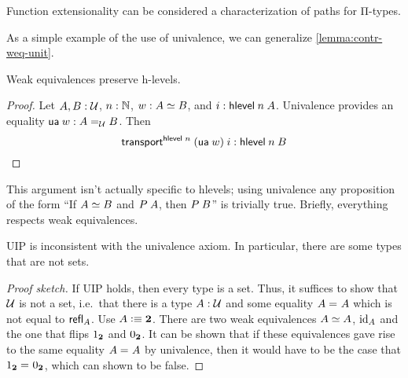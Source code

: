\documentclass[./thesis.tex]{subfiles}
\begin{document}
Function extensionality can be considered a characterization of paths for Π-types.

As a simple example of the use of univalence, we can generalize
\cref{lemma:contr-weq-unit}.

\begin{theorem}
	Weak equivalences preserve h-levels.
\end{theorem}
\begin{proof}
  Let $A,B:\mathcal{U}$, $n:\mathbb{N}$, $w:A \simeq B$, and $i:\mathsf{hlevel}\hspace{0.25em} n \hspace{0.25em} A$.
	Univalence provides an equality $\mathsf{ua}\hspace{0.25em} w:A =_{\mathcal{U}} B$. 
  Then
  \begin{equation*}
    \mathsf{transport}^{\mathsf{hlevel}\hspace{0.25em} n}\hspace{0.25em} (\mathsf{ua}\hspace{0.25em} w) \hspace{0.25em} i : \mathsf{hlevel}\hspace{0.25em} n \hspace{0.25em} B
  \end{equation*}
\end{proof}

This argument isn't actually specific to hlevels; using univalence any
proposition of the form ``If $A \simeq B$ and $P\hspace{0.25em} A$, then $P\hspace{0.25em} B$''
is trivially true. Briefly, everything respects weak equivalences.
	
\begin{theorem}
	UIP is inconsistent with the univalence axiom. In particular, there are some
  types that are not sets.
\end{theorem}
\begin{proof}[Proof sketch]
  If UIP holds, then every type is a set. Thus, it suffices to show that $\mathcal{U}$
  is not a set, i.e.\ that there is a type $A:\mathcal{U}$ and some equality
  $A =_{} A$ which is not equal to $\mathsf{refl}_{A}$. Use $A\vcentcolon\equiv\mathbf{2}$.
  There are two weak equivalences $A \simeq A$, $\operatorname{id}_A$ and the one that flips
  $1_{\mathbf{2}}$ and $0_{\mathbf{2}}$. It can be shown that if these equivalences gave rise
  to the same equality $A =_{} A$ by univalence, then it would have to be
  the case that $1_{\mathbf{2}} =_{} 0_{\mathbf{2}}$, which can shown to be false.
\end{proof}
\end{document}
